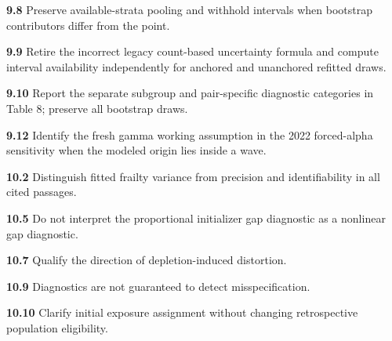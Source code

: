 \documentclass[
]{article}
\begin{document}
\par\hypertarget{issue-9.8}{}\textbf{9.8} Preserve available-strata pooling and withhold intervals when bootstrap contributors differ from the point.
\par\hypertarget{issue-9.9}{}\textbf{9.9} Retire the incorrect legacy count-based uncertainty formula and compute interval availability independently for anchored and unanchored refitted draws.
\par\hypertarget{issue-9.10}{}\textbf{9.10} Report the separate subgroup and pair-specific diagnostic categories in Table 8; preserve all bootstrap draws.
\par\hypertarget{issue-9.12}{}\textbf{9.12} Identify the fresh gamma working assumption in the 2022 forced-alpha sensitivity when the modeled origin lies inside a wave.
\par\hypertarget{issue-10.2}{}\textbf{10.2} Distinguish fitted frailty variance from precision and identifiability in all cited passages.
\par\hypertarget{issue-10.5}{}\textbf{10.5} Do not interpret the proportional initializer gap diagnostic as a nonlinear gap diagnostic.
\par\hypertarget{issue-10.7}{}\textbf{10.7} Qualify the direction of depletion-induced distortion.
\par\hypertarget{issue-10.9}{}\textbf{10.9} Diagnostics are not guaranteed to detect misspecification.
\par\hypertarget{issue-10.10}{}\textbf{10.10} Clarify initial exposure assignment without changing retrospective population eligibility.
\end{document}

